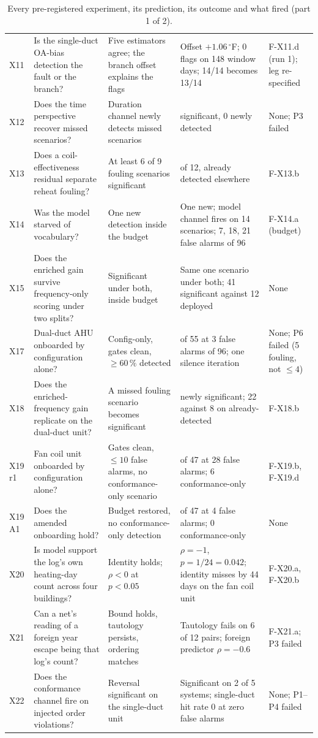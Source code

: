 \documentclass[11pt,letterpaper]{article}
\begin{document}
\begin{table}[p]
\begin{tabular}{@{}>{\raggedright\arraybackslash}p{1.1cm}>{\raggedright\arraybackslash}p{4.6cm}>{\raggedright\arraybackslash}p{3.3cm}>{\raggedright\arraybackslash}p{4.3cm}>{\raggedright\arraybackslash}p{2.2cm}@{}}
X11 & Is the single-duct OA-bias detection the fault or the branch? & Five estimators agree; the branch offset explains the flags & Offset $+1.06\,^\circ$F; 0 flags on 148 window days; 14/14 becomes 13/14 & F-X11.d (run 1); leg re-specified \\
X12 & Does the time perspective recover missed scenarios? & Duration channel newly detects missed scenarios & 11 significant, 0 newly detected & None; P3 failed \\
X13 & Does a coil-effectiveness residual separate reheat fouling? & At least 6 of 9 fouling scenarios significant & 1 of 12, already detected elsewhere & F-X13.b \\
X14 & Was the model starved of vocabulary? & One new detection inside the budget & One new; model channel fires on 14 scenarios; 7, 18, 21 false alarms of 96 & F-X14.a (budget) \\
X15 & Does the enriched gain survive frequency-only scoring under two splits? & Significant under both, inside budget & Same one scenario under both; 41 significant against 12 deployed & None \\
X17 & Dual-duct AHU onboarded by configuration alone? & Config-only, gates clean, $\ge 60\,\%$ detected & 45 of 55 at 3 false alarms of 96; one silence iteration & None; P6 failed (5 fouling, not $\le 4$) \\
X18 & Does the enriched-frequency gain replicate on the dual-duct unit? & A missed fouling scenario becomes significant & 0 newly significant; 22 against 8 on already-detected & F-X18.b \\
X19 r1 & Fan coil unit onboarded by configuration alone? & Gates clean, $\le 10$ false alarms, no conformance-only scenario & 47 of 47 at 28 false alarms; 6 conformance-only & F-X19.b, F-X19.d \\
X19 A1 & Does the amended onboarding hold? & Budget restored, no conformance-only detection & 41 of 47 at 4 false alarms; 0 conformance-only & None \\
X20 & Is model support the log's own heating-day count across four buildings? & Identity holds; $\rho < 0$ at $p < 0.05$ & $\rho = -1$, $p = 1/24 = 0.042$; identity misses by 44 days on the fan coil unit & F-X20.a, F-X20.b \\
X21 & Can a net's reading of a foreign year escape being that log's count? & Bound holds, tautology persists, ordering matches & Tautology fails on 6 of 12 pairs; foreign predictor $\rho = -0.6$ & F-X21.a; P3 failed \\
X22 & Does the conformance channel fire on injected order violations? & Reversal significant on the single-duct unit & Significant on 2 of 5 systems; single-duct hit rate 0 at zero false alarms & None; P1--P4 failed \\
\hline
\end{tabular}
\caption{Every pre-registered experiment, its prediction, its outcome and what fired (part 1 of 2).}
\label{tab:ledger}
\end{table}
\end{document}
